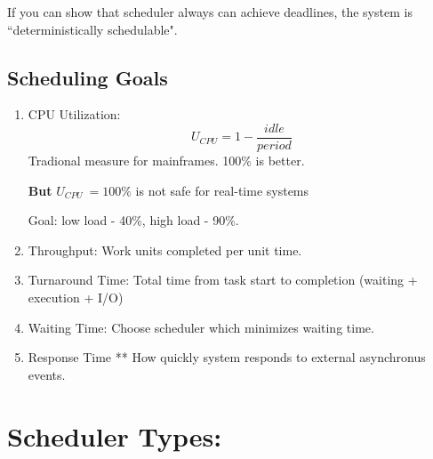 If you can show that scheduler always can achieve deadlines, 
the system is ``deterministically schedulable".


\subsection{Scheduling Goals}
\begin{enumerate}
\item CPU Utilization:
\[
U_{CPU} = 1 - \frac{idle}{period}
\]
Tradional measure for mainframes.  100\% is better.

{\bf But} $U_{CPU} ~= 100\%$ is not safe for real-time systems

Goal:   low load - 40\%, high load - 90\%.

\item Throughput: 
Work units completed per unit time.

\item Turnaround Time:
Total time from task start to completion (waiting + execution + I/O)

\item Waiting Time: 
Choose scheduler which minimizes waiting time. 

\item Response Time **
How quickly system responds to external asynchronus events. 
\end{enumerate}


\section*{Scheduler Types:}
